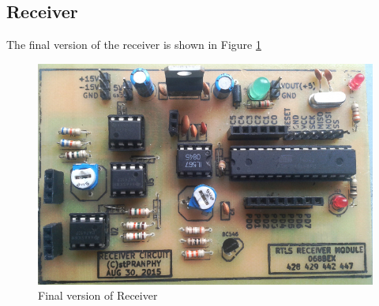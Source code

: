 \subsection{Receiver}
The final version of the receiver is shown in Figure \ref{fig:ReceiverModule}
\begin{figure}[htpb]
	\centering
	\includegraphics[scale=0.5]{Images/ReceiverModule.jpg}
	\caption{Final version of Receiver}
	\label{fig:ReceiverModule}
\end{figure}
